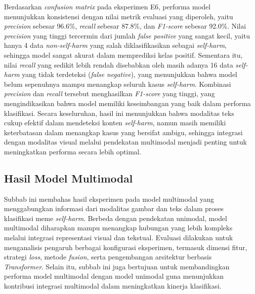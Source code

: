 Berdasarkan \textit{confusion matrix} pada eksperimen E6, performa model menunjukkan konsistensi dengan nilai metrik evaluasi yang diperoleh, yaitu \textit{precision} sebesar 96.6\%, \textit{recall} sebesar 87.8\%, dan \textit{F1-score} sebesar 92.0\%. Nilai \textit{precision} yang tinggi tercermin dari jumlah \textit{false positive} yang sangat kecil, yaitu hanya 4 data \textit{non-self-harm} yang salah diklasifikasikan sebagai \textit{self-harm}, sehingga model sangat akurat dalam memprediksi kelas positif. Sementara itu, nilai \textit{recall} yang sedikit lebih rendah disebabkan oleh masih adanya 16 data \textit{self-harm} yang tidak terdeteksi (\textit{false negative}), yang menunjukkan bahwa model belum sepenuhnya mampu menangkap seluruh kasus \textit{self-harm}. Kombinasi \textit{precision} dan \textit{recall} tersebut menghasilkan \textit{F1-score} yang tinggi, yang mengindikasikan bahwa model memiliki keseimbangan yang baik dalam performa klasifikasi. Secara keseluruhan, hasil ini menunjukkan bahwa modalitas teks cukup efektif dalam mendeteksi konten \textit{self-harm}, namun masih memiliki keterbatasan dalam menangkap kasus yang bersifat ambigu, sehingga integrasi dengan modalitas visual melalui pendekatan multimodal menjadi penting untuk meningkatkan performa secara lebih optimal.





\subsection{Hasil Model Multimodal}
\label{IV.Hasil Multimodal}
Subbab ini membahas hasil eksperimen pada model multimodal yang menggabungkan informasi dari modalitas gambar dan teks dalam proses klasifikasi meme \textit{self-harm}. Berbeda dengan pendekatan unimodal, model multimodal diharapkan mampu menangkap hubungan yang lebih kompleks melalui integrasi representasi visual dan tekstual. Evaluasi dilakukan untuk menganalisis pengaruh berbagai konfigurasi eksperimen, termasuk dimensi fitur, strategi \textit{loss}, metode \textit{fusion}, serta pengembangan arsitektur berbasis \textit{Transformer}. Selain itu, subbab ini juga bertujuan untuk membandingkan performa model multimodal dengan model unimodal guna menunjukkan kontribusi integrasi multimodal dalam meningkatkan kinerja klasifikasi.

